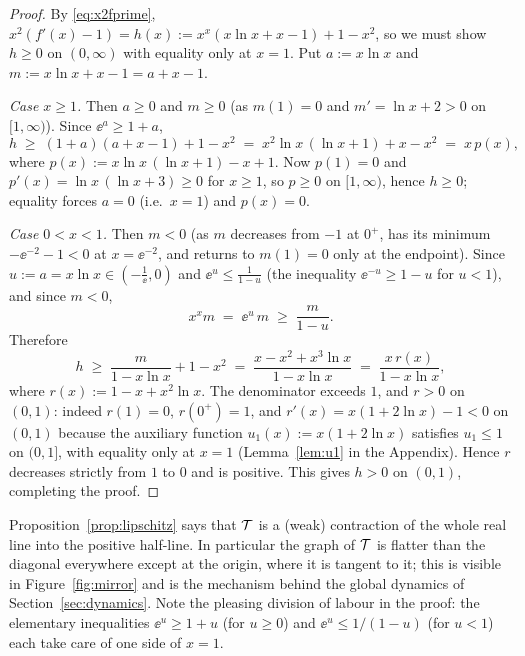 \begin{proof}
By \eqref{eq:x2fprime},
$x^{2}(f'(x) - 1) = h(x) := x^{x}(x\ln x + x - 1) + 1 - x^{2}$, so we
must show $h \ge 0$ on $(0,\infty)$ with equality only at $x = 1$. Put
$a := x \ln x$ and $m := x\ln x + x - 1 = a + x - 1$.

\emph{Case $x \ge 1$.} Then $a \ge 0$ and $m \ge 0$ (as $m(1) = 0$ and
$m' = \ln x + 2 > 0$ on $[1,\infty)$). Since $\ee^{a} \ge 1 + a$,
\[
    h \;\ge\; (1 + a)(a + x - 1) + 1 - x^{2}
    \;=\; x^{2}\ln x\,(\ln x + 1) + x - x^{2}
    \;=\; x\,p(x),
\]
where $p(x) := x\ln x\,(\ln x + 1) - x + 1$. Now
$p(1) = 0$ and $p'(x) = \ln x\,(\ln x + 3) \ge 0$ for $x \ge 1$, so
$p \ge 0$ on $[1,\infty)$, hence $h \ge 0$; equality forces $a = 0$
(i.e.\ $x = 1$) and $p(x) = 0$.

\emph{Case $0 < x < 1$.} Then $m < 0$ (as $m$ decreases from
$-1$ at $0^{+}$, has its minimum $-\ee^{-2} - 1 < 0$ at $x = \ee^{-2}$,
and returns to $m(1) = 0$ only at the endpoint). Since
$u := a = x\ln x \in (-\tfrac1\ee, 0)$ and $\ee^{u} \le \tfrac{1}{1-u}$
(the inequality $\ee^{-u} \ge 1 - u$ for $u < 1$), and since $m < 0$,
\[
    x^{x} m \;=\; \ee^{u}\,m \;\ge\; \frac{m}{1 - u} .
\]
Therefore
\[
    h \;\ge\; \frac{m}{1 - x\ln x} + 1 - x^{2}
    \;=\; \frac{x - x^{2} + x^{3}\ln x}{1 - x\ln x}
    \;=\; \frac{x\,r(x)}{1 - x\ln x},
\]
where $r(x) := 1 - x + x^{2}\ln x$. The denominator exceeds $1$, and
$r > 0$ on $(0,1)$: indeed $r(1) = 0$, $r(0^{+}) = 1$, and
$r'(x) = x(1 + 2\ln x) - 1 < 0$ on $(0,1)$ because the auxiliary
function $u_{1}(x) := x(1 + 2\ln x)$ satisfies $u_{1} \le 1$ on
$(0,1]$, with equality only at $x = 1$ (Lemma~\ref{lem:u1} in the
Appendix). Hence $r$ decreases strictly from $1$
to $0$ and is positive. This gives $h > 0$ on $(0,1)$, completing the
proof.
\end{proof}

\begin{remark}
Proposition~\ref{prop:lipschitz} says that $\mathcal{T}$ is a (weak)
contraction of the whole real line into the positive half-line. In
particular the graph of $\mathcal{T}$ is flatter than the diagonal everywhere
except at the origin, where it is tangent to it; this is visible in
Figure~\ref{fig:mirror} and is the mechanism behind the global dynamics
of Section~\ref{sec:dynamics}. Note the pleasing division of labour in
the proof: the elementary inequalities $\ee^{u} \ge 1 + u$ (for $u \ge
0$) and $\ee^{u} \le 1/(1-u)$ (for $u < 1$) each take care of one side
of $x = 1$.
\end{remark}
